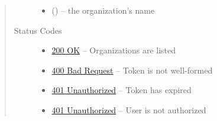 \documentclass[letterpaper,10pt,english]{sphinxmanual}
\begin{document}
\begin{fulllineitems}
\begin{quote}
\begin{description}
\begin{itemize}
\item {} 
 () -- the organization's name

\end{itemize}

\item[{Status Codes}] \leavevmode\begin{itemize}
\item {} 
\href{http://www.w3.org/Protocols/rfc2616/rfc2616-sec10.html\#sec10.2.1}{200 OK} -- Organizations are listed

\item {} 
\href{http://www.w3.org/Protocols/rfc2616/rfc2616-sec10.html\#sec10.4.1}{400 Bad Request} -- Token is not well-formed

\item {} 
\href{http://www.w3.org/Protocols/rfc2616/rfc2616-sec10.html\#sec10.4.2}{401 Unauthorized} -- Token has expired

\item {} 
\href{http://www.w3.org/Protocols/rfc2616/rfc2616-sec10.html\#sec10.4.2}{401 Unauthorized} -- User is not authorized

\end{itemize}

\end{description}\end{quote}

\end{fulllineitems}
\end{document}
